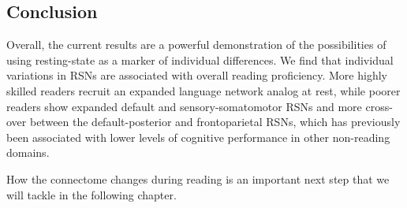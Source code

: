 \subsection{Conclusion}

Overall, the current results are a powerful demonstration of the possibilities of using resting-state as a marker of individual differences.  We find that individual variations in RSNs are associated with overall reading proficiency.  More highly skilled readers recruit an expanded language network analog at rest, while poorer readers show expanded default and sensory-somatomotor RSNs and more cross-over between the default-posterior and frontoparietal RSNs, which has previously been associated with lower levels of cognitive performance in other non-reading domains. 

How the connectome changes during reading is an important next step that we will tackle in the following chapter.

